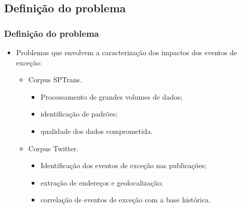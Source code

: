\documentclass{beamer}
\begin{document}
\subsection{Definição do problema}
\begin{frame}
\frametitle{Definição do problema}

\begin{itemize}
\item \alert{Problemas que envolvem a caracterização dos impactos dos eventos de exceção}:
\begin{itemize}
\item Corpus SPTrans.
\begin{itemize}
\item Processamento de grandes volumes de dados;
\item identificação de padrões;
\item qualidade dos dados comprometida.
\end{itemize}
\item Corpus Twitter.
\begin{itemize}
\item Identificação dos eventos de exceção nas publicações; 
\item extração de endereços e geolocalização; 
\item correlação de eventos de exceção com a base histórica.
\end{itemize}
\end{itemize}
\end{itemize}


\end{frame}
\end{document}
